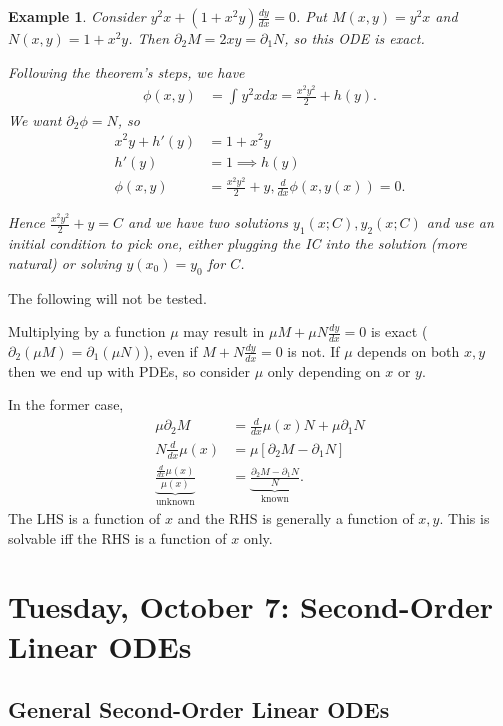 \documentclass{tufte-handout}
\newtheorem{ex}[thm]{Example}
\theoremstyle{definition}
\begin{document}
\begin{ex}
	Consider $y^2x + (1+x^2y) \frac{dy}{dx} = 0$.
	Put $M(x,y) = y^2x$ and $N(x,y) = 1+x^2y$. Then $\partial_2 M = 2xy = \partial_1 N$, so this ODE is exact.

	Following the theorem's steps, we have
	\begin{align*}
		\phi(x,y) &= \int_{}^{} y^2xdx = \frac{x^2y^2}{2} + h(y)
	.\end{align*}
	We want $\partial_2 \phi = N$, so
	\begin{align*}
		x^2 y + h'(y) &= 1+ x^2 y \\
		h'(y) &=  1 \implies h(y) \\
		\phi(x,y) &= \frac{x^2y^2}{2}+y, \frac{d}{dx} \phi(x,y(x))=0		
	.\end{align*}

	Hence $\frac{x^2y^2}{2} + y = C$ and we have two solutions $y_1(x;C), y_2(x;C)$ and use an initial condition to pick one, either plugging the IC into the solution (more natural) or solving $y(x_0) = y_0$ for $C$.
\end{ex}

The following will not be tested.

Multiplying by a function $\mu$ may result in $\mu M + \mu N \frac{dy}{dx} = 0$ is exact ($\partial_2 (\mu M) = \partial_1 (\mu N)$), even if $M + N \frac{dy}{dx} = 0$ is not. If $\mu$ depends on both $x,y$ then we end up with PDEs, so consider $\mu$ only depending on $x$ or $y$.

In the former case, 
\begin{align*}
	\mu \partial_2 M &= \frac{d}{dx} \mu(x) N + \mu \partial_1 N \\
	N \frac{d}{dx}\mu(x) &= \mu \left[ \partial_2 M - \partial_1 N \right] \\
	\underbrace{\frac{\frac{d}{dx}\mu(x)}{\mu(x)}}_{\text{unknown}} &= \underbrace{\frac{\partial_2 M - \partial_1 N}{N}}_{\text{known}}.
\end{align*}
The LHS is a function of $x$ and the RHS is generally a function of $x,y$. This is solvable iff the RHS is a function of $x$ only.

\section{Tuesday, October 7: Second-Order Linear ODEs}

\subsection{General Second-Order Linear ODEs}
\end{document}
